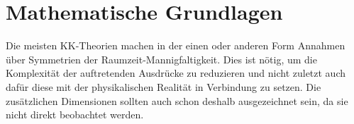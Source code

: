 % 
% 
\chapter{Mathematische Grundlagen \label{chap:Mathematische Grundlagen}}
Die meisten KK-Theorien machen in der einen oder anderen Form Annahmen über
Symmetrien der Raumzeit-Mannigfaltigkeit. Dies ist nötig, um die Komplexität der
auftretenden Ausdrücke zu reduzieren und nicht zuletzt auch dafür diese mit der
physikalischen Realität in Verbindung zu setzen. Die zusätzlichen Dimensionen
sollten auch schon deshalb ausgezeichnet sein, da sie nicht direkt beobachtet
werden.

